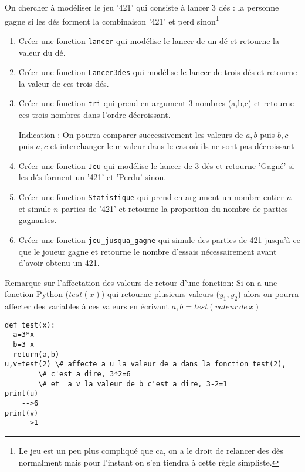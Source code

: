 \documentclass[a4paper, 11pt,reqno]{article}
\begin{document}
\begin{exercice}
On chercher à modéliser le jeu '421' qui consiste à lancer 3 dés : la personne gagne si les dés forment la combinaison '421' et perd sinon\footnote{Le jeu est un peu plus compliqué que ca, on a le droit de relancer des dès normalment mais pour l'instant on s'en tiendra à cette règle simpliste.}

\begin{enumerate}
\item Créer une fonction \texttt{lancer} qui modélise le lancer de un dé et retourne la valeur du dé.
\item Créer une fonction \texttt{Lancer3des} qui modélise le lancer de trois dés et retourne la valeur de ces trois dés.
\item Créer une fonction \texttt{tri} qui prend en argument 3 nombres (a,b,c) et retourne ces trois nombres dans l'ordre décroissant. 

{\footnotesize{Indication :  On pourra comparer successivement les valeurs de $a,b$ puis $b,c$ puis $a,c$ et interchanger leur valeur dans le cas où ils ne sont pas décroissant}}

\item Créer une fonction \texttt{Jeu} qui modélise le lancer de 3 dés et retourne 'Gagné' si les dés forment un '421' et 'Perdu' sinon.
\item Créer une fonction \texttt{Statistique} qui prend en argument un nombre entier $n$ et simule $n$ parties de '421' et retourne la proportion du nombre de parties gagnantes.
\item Créer une fonction \texttt{jeu\_jusqua\_gagne} qui simule des parties de 421 jusqu'à ce que le joueur gagne et retourne le nombre d'essais nécessairement avant d'avoir obtenu un 421.


\end{enumerate}


Remarque sur l'affectation des valeurs de retour d'une fonction:
Si on a une fonction Python ($test(x)$) qui retourne plusieurs valeurs ($y_1,y_2$) alors on pourra affecter des variables à ces valeurs en écrivant 
$a,b =test(valeur\,  de \, x)$

\begin{lstlisting}
def test(x):
  a=3*x
  b=3-x
  return(a,b)
u,v=test(2) \# affecte a u la valeur de a dans la fonction test(2), 
		\# c'est a dire, 3*2=6
		\# et  a v la valeur de b c'est a dire, 3-2=1
print(u)
	-->6
print(v)
	-->1
\end{lstlisting}




\end{exercice}
\end{document}
